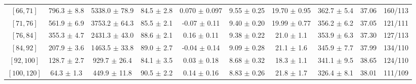 \begin{tabular}{c||c|c|c|c|c|c|c||c|c}
$[66, 71]$ & 796.3 $\pm$ 8.8 & 5338.0 $\pm$ 78.9 & 84.5 $\pm$ 2.8 & 0.070 $\pm$ 0.097 & 9.55 $\pm$ 0.25 & 19.70 $\pm$ 0.95 & 362.7 $\pm$ 5.4 & 37.06 & 160/113\\
$[71, 76]$ & 561.9 $\pm$ 6.9 & 3753.2 $\pm$ 64.3 & 85.5 $\pm$ 2.1 & -0.07 $\pm$ 0.11 & 9.40 $\pm$ 0.20 & 19.99 $\pm$ 0.77 & 356.2 $\pm$ 6.2 & 37.05 & 121/111\\
$[76, 84]$ & 355.3 $\pm$ 4.7 & 2431.3 $\pm$ 43.0 & 88.6 $\pm$ 2.1 & 0.16 $\pm$ 0.11 & 9.38 $\pm$ 0.22 & 21.0 $\pm$ 1.1 & 353.9 $\pm$ 6.3 & 37.30 & 127/113\\
$[84, 92]$ & 207.9 $\pm$ 3.6 & 1463.5 $\pm$ 33.8 & 89.0 $\pm$ 2.7 & -0.04 $\pm$ 0.14 & 9.09 $\pm$ 0.28 & 21.1 $\pm$ 1.6 & 345.9 $\pm$ 7.7 & 37.99 & 134/110\\
$[92, 100]$ & 128.7 $\pm$ 2.7 & 929.7 $\pm$ 26.4 & 84.1 $\pm$ 3.5 & 0.03 $\pm$ 0.18 & 8.68 $\pm$ 0.32 & 18.3 $\pm$ 1.1 & 341.1 $\pm$ 9.5 & 38.65 & 124/110\\
$[100, 120]$ & 64.3 $\pm$ 1.3 & 449.9 $\pm$ 11.8 & 90.5 $\pm$ 2.2 & 0.14 $\pm$ 0.16 & 8.83 $\pm$ 0.26 & 21.8 $\pm$ 1.7 & 326.4 $\pm$ 8.1 & 38.01 & 111/109\\
\end{tabular}
